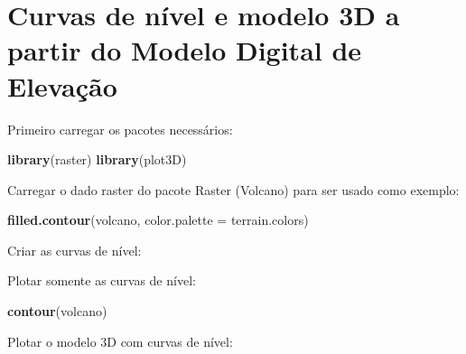 \documentclass[
]{book}
\newenvironment{Shaded}{\begin{snugshade}}{\end{snugshade}}
\newcommand{\ControlFlowTok}[1]{\textcolor[rgb]{0.13,0.29,0.53}{\textbf{#1}}}
\newcommand{\DataTypeTok}[1]{\textcolor[rgb]{0.13,0.29,0.53}{#1}}
\newcommand{\KeywordTok}[1]{\textcolor[rgb]{0.13,0.29,0.53}{\textbf{#1}}}
\newcommand{\NormalTok}[1]{#1}
\newcommand{\OperatorTok}[1]{\textcolor[rgb]{0.81,0.36,0.00}{\textbf{#1}}}
\newcommand{\StringTok}[1]{\textcolor[rgb]{0.31,0.60,0.02}{#1}}
\begin{document}
\hypertarget{curvas-de-nuxedvel-e-modelo-3d-a-partir-do-modelo-digital-de-elevauxe7uxe3o}{%
\section{Curvas de nível e modelo 3D a partir do Modelo Digital de Elevação}\label{curvas-de-nuxedvel-e-modelo-3d-a-partir-do-modelo-digital-de-elevauxe7uxe3o}}

Primeiro carregar os pacotes necessários:

\begin{Shaded}
\begin{Highlighting}[]
\KeywordTok{library}\NormalTok{(raster)}
\KeywordTok{library}\NormalTok{(plot3D)}
\end{Highlighting}
\end{Shaded}

Carregar o dado raster do pacote Raster (Volcano) para ser usado como exemplo:

\begin{Shaded}
\begin{Highlighting}[]
\KeywordTok{filled.contour}\NormalTok{(volcano, }\DataTypeTok{color.palette =}\NormalTok{ terrain.colors)}
\end{Highlighting}
\end{Shaded}

Criar as curvas de nível:

\begin{Shaded}
\end{Shaded}

Plotar somente as curvas de nível:

\begin{Shaded}
\begin{Highlighting}[]
\KeywordTok{contour}\NormalTok{(volcano)}
\end{Highlighting}
\end{Shaded}

Plotar o modelo 3D com curvas de nível:
\end{document}
